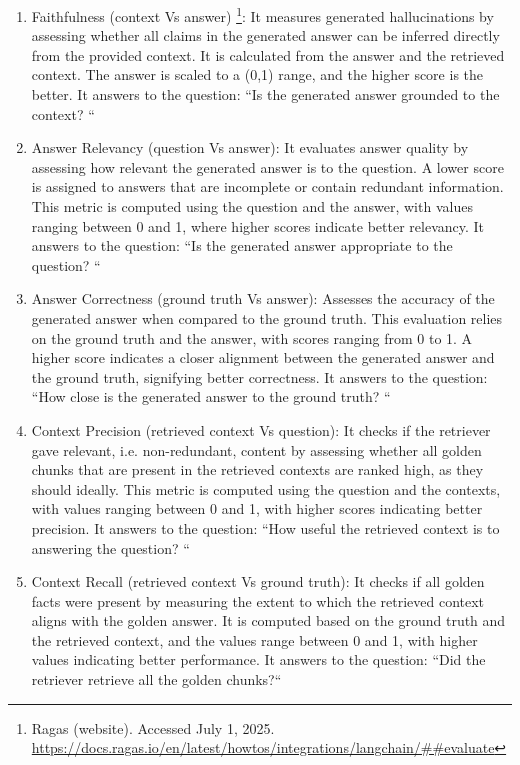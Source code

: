 \begin{enumerate}
\item Faithfulness (context Vs answer) \footnote{Ragas (website). Accessed July 1, 2025. \url{https://docs.ragas.io/en/latest/howtos/integrations/langchain/##evaluate}}: It measures generated hallucinations by assessing whether all claims in the generated answer can be inferred directly from the provided context. It is calculated from the answer and the retrieved context. The answer is scaled to a (0,1) range, and the higher score is the better. It answers to the question: ``Is the generated answer grounded to the context? ``
\item Answer Relevancy (question Vs answer): It evaluates answer quality by assessing how relevant the generated answer is to the question. A lower score is assigned to answers that are incomplete or contain redundant information. This metric is computed using the question and the answer, with values ranging between 0 and 1, where higher scores indicate better relevancy. It answers to the question: ``Is the generated answer appropriate to the question? ``
\item Answer Correctness (ground truth Vs answer): Assesses the accuracy of the generated answer when compared to the ground truth. This evaluation relies on the ground truth and the answer, with scores ranging from 0 to 1. A higher score indicates a closer alignment between the generated answer and the ground truth, signifying better correctness. It answers to the question: ``How close is the generated answer to the ground truth? ``
\item Context Precision (retrieved context Vs question): It checks if the retriever gave relevant, i.e. non-redundant, content by assessing whether all golden chunks that are present in the retrieved contexts are ranked high, as they should ideally. This metric is computed using the question and the contexts, with values ranging between 0 and 1, with higher scores indicating better precision. It answers to the question: ``How useful the retrieved context is to answering the question? ``
\item Context Recall (retrieved context Vs ground truth): It checks if all golden facts were present by measuring the extent to which the retrieved context aligns with the golden answer. It is computed based on the ground truth and the retrieved context, and the values range between 0 and 1, with higher values indicating better performance. It answers to the question: ``Did the retriever retrieve all the golden chunks?``
\end{enumerate}



